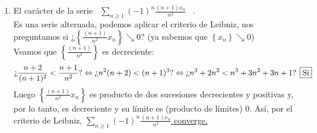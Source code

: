 \documentclass[12pt]{article}
\begin{document}
\begin{ejercicio}[2 puntos]
\begin{enumerate}
			
			\item El carácter de la serie \ $\sum\limits_{n\geq 1} \left(-1\right)^n \frac{(n+1)x_n}{n^2}$ \ .	\\
			Es una serie alternada, podemos aplicar el criterio de Leibniz, nos preguntamos si ¿$ \left\{\frac{(n+1)}{n^2}x_n\right\} \searrow 0$? (ya sabemos que $\left\{x_n\right\} \searrow 0$) \\
			Veamos que $\left\{\frac{(n+1)}{n^2}\right\}$ es decreciente:
			\begin{gather*}
				\text{¿} \frac{n+2}{(n+1)^2} < \frac{n+1}{n^2} \text{?} \Leftrightarrow \text{¿} n^2(n+2) < (n+1)^3 \text{?} \Leftrightarrow \text{¿} n^3 + 2n^2 < n^3 +3n^2+3n+1 \text{? \fbox{Sí}}  
			\end{gather*}
			Luego $\left\{\frac{(n+1)}{n^2}x_n\right\}$ es producto de dos sucesiones decrecientes y positivas y, por lo tanto, es decreciente y su límite es (producto de límites) 0. Así, por el criterio de Leibniz, \underline{\underline{ $\sum\limits_{n\geq 1} \left(-1\right)^n \frac{(n+1)x_n}{n^2}$ converge.}}
		\end{enumerate}
	\end{ejercicio}
	
\end{document}
